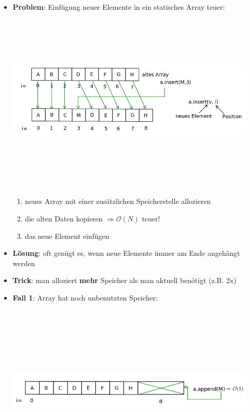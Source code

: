 \documentclass[11pt, fleqn]{scrreprt}
\newcommand{\bigO}[0]{\mathcal{O}}
\begin{document}
\begin{itemize}
    \item \textbf{Problem}: Einfügung neuer Elemente in ein statisches Array teuer: \\
    \includegraphics[width=12cm,height=9cm,keepaspectratio]{./Pictures/dynamischesArray.png}
    \begin{enumerate}
        \item neues Array mit einer zusätzlichen Speicherstelle allozieren
        \item die alten Daten kopieren $\Rightarrow \bigO{}(N)$ teuer!
        \item das neue Element einfügen
    \end{enumerate}
    \item \textbf{Lösung}: oft genügt es, wenn neue Elemente immer am Ende angehängt werden
    \item \textbf{Trick}: man alloziert \textbf{mehr} Speicher als man aktuell benötigt (z.B. 2x)
    \item \textbf{Fall 1}: Array hat noch unbenutzten Speicher: \\
    \includegraphics[width=12cm,height=9cm,keepaspectratio]{./Pictures/dynArrunbenutzt.png}

\end{itemize}
\end{document}
